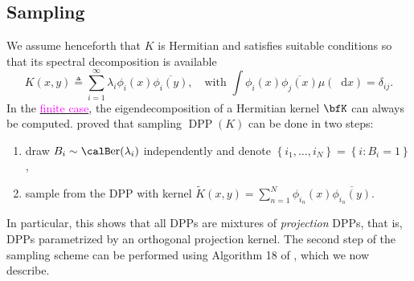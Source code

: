 \documentclass[twoside,11pt]{article}
\newcommand\DPP{\operatorname{DPP}}
\renewcommand{\tilde}{\widetilde}
\newcommand{\suml}{ \sum\limits }
\newcommand*\diff{\mathop{}\!\mathrm{d}}
\newcommand{\lrcb}[1]{\left\{ #1 \right\}}
\newcommand\Ber{\operatorname{\calB er }}
\begin{document}
	\subsection{Sampling} %
	\label{sub:sampling}

	  We assume henceforth that $K$ is Hermitian and satisfies suitable conditions \cite[Theorem 3]{Sos00} so that its spectral decomposition is available
	  \begin{equation*}
	  \label{eq:eigdec_kernel}
	    K(x,y)
	    \triangleq
	      \suml_{i=1}^{\infty}
	        \lambda_i \phi_i(x) \overline{\phi_i(y)},
	      \quad \text{with }
	        \int \phi_i(x) \overline{\phi_j(x)} \mu(\diff x) = \delta_{ij}.
	  \end{equation*}
	  In the \href{https://dppy.readthedocs.io/en/latest/finite_dpps/exact_sampling.html}{\textcolor{magenta}{finite case}}, the eigendecomposition of a Hermitian kernel $\bfK$ can always be computed.
	  \citet[Theorem 7]{HKPV06} proved that sampling $\DPP(K)$ can be done in two steps:
	  \begin{enumerate}
	    \item draw $B_i\sim\Ber(\lambda_i)$ independently and denote $\lrcb{i_1,\dots,i_{N}} = \lrcb{i:B_i=1}$,
	    \item sample from the DPP with kernel $\tilde{K}(x,y) = \sum_{n=1}^{N}\phi_{i_n}(x) \overline{\phi_{i_n}(y)}$.
	  \end{enumerate}
	  In particular, this shows that all DPPs are mixtures of \emph{projection} DPPs, that is, DPPs parametrized by an orthogonal projection kernel.
	  The second step of the sampling scheme can be performed using Algorithm 18 of \cite{HKPV06}, which we now describe.
\end{document}
